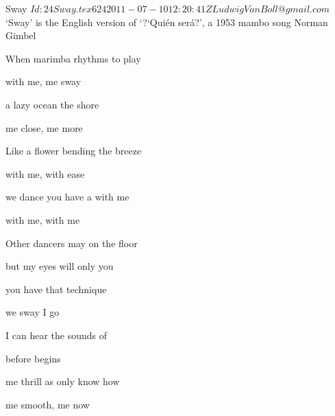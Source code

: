 \begin{SBSong}{Sway}
  {$Id: 24Sway.tex 624 2011-07-10 12:20:41Z LudwigVanBoll@gmail.com $}
  {`Sway' is the English version of `?`Qui\'en ser\'a?', a 1953 mambo song}
  {Norman Gimbel}
  \begin{SBVerse}
    When marimba rhythms  to play

     with me,  me sway
    
     a lazy ocean  the shore
    
     me close,  me more 
  \end{SBVerse}
  \begin{SBVerse}
    Like a flower bending  the breeze
    
     with me,  with ease
    
     we dance you have a  with me
    
     with me,  with me 
  \end{SBVerse}
  \begin{SBVerse}
    Other dancers may  on the floor
    
     but my eyes will  only you
    
     you have that  technique
    
     we sway I go  
  \end{SBVerse}
  \begin{SBVerse}
    I can hear the sounds of 
    
     before  begins
    
     me thrill as only  know how
    
     me smooth,  me now 
  \end{SBVerse}
\end{SBSong}
